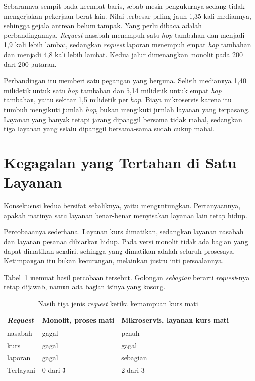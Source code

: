 Sebarannya sempit pada keempat baris, sebab mesin pengukurnya sedang tidak
mengerjakan pekerjaan berat lain. Nilai terbesar paling jauh 1,35 kali
mediannya, sehingga gejala antrean belum tampak. Yang perlu dibaca adalah
perbandingannya. \textit{Request} nasabah menempuh satu \textit{hop} tambahan dan
menjadi 1,9 kali lebih lambat, sedangkan \textit{request} laporan menempuh empat
\textit{hop} tambahan dan menjadi 4,8 kali lebih lambat. Kedua jalur dimenangkan
monolit pada 200 dari 200 putaran.

Perbandingan itu memberi satu pegangan yang berguna. Selisih mediannya 1,40
milidetik untuk satu \textit{hop} tambahan dan 6,14 milidetik untuk empat
\textit{hop} tambahan, yaitu sekitar 1,5 milidetik per \textit{hop}. Biaya
mikroservis karena itu tumbuh mengikuti jumlah \textit{hop}, bukan mengikuti
jumlah layanan yang terpasang.
Layanan yang banyak tetapi jarang dipanggil bersama tidak mahal, sedangkan tiga
layanan yang selalu dipanggil bersama-sama sudah cukup mahal.

\section{Kegagalan yang Tertahan di Satu Layanan}

Konsekuensi kedua bersifat sebaliknya, yaitu menguntungkan. Pertanyaannya,
apakah matinya satu layanan benar-benar menyisakan layanan lain tetap hidup.

Percobaannya sederhana. Layanan kurs dimatikan, sedangkan layanan nasabah dan
layanan pesanan dibiarkan hidup. Pada versi monolit tidak ada bagian yang dapat
dimatikan sendiri, sehingga yang dimatikan adalah seluruh prosesnya.
Ketimpangan itu bukan kecurangan, melainkan justru inti persoalannya.

Tabel~\ref{tab:kegagalan-mikroservis} memuat hasil percobaan tersebut. Golongan
\textit{sebagian} berarti \textit{request}-nya tetap dijawab, namun ada bagian isinya
yang kosong.

\begin{table}[htbp]
  \centering
  \caption{Nasib tiga jenis \textit{request} ketika kemampuan kurs mati}
  \label{tab:kegagalan-mikroservis}
  \begin{tabularx}{\textwidth}{|l|X|X|}
    \hline
    \textbf{\textit{Request}} & \textbf{Monolit, proses mati} & \textbf{Mikroservis, layanan kurs mati} \\
    \hline
    nasabah & gagal & penuh \\
    \hline
    kurs & gagal & gagal \\
    \hline
    laporan & gagal & sebagian \\
    \hline
    Terlayani & 0 dari 3 & 2 dari 3 \\
    \hline
  \end{tabularx}
\end{table}

